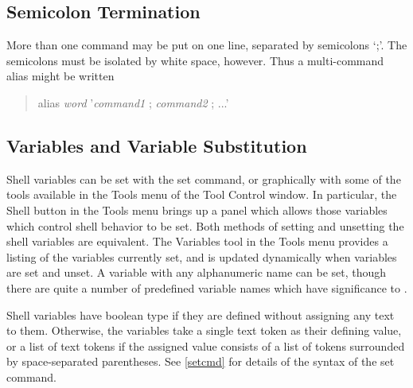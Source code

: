 \subsection{Semicolon Termination}


More than one command may be put on one line, separated by semicolons
`{\vt ;}'.  The semicolons must be isolated by white space, however. 
Thus a multi-command alias might be written
\begin{quote}
{\vt alias} {\it word} '{\it command1} ; {\it command2} ; ...'
\end{quote}

\subsection{Variables and Variable Substitution}
\label{variablesub}


Shell variables can be set with the {\cb set} command, or graphically
with some of the tools available in the {\cb Tools} menu of the {\cb
Tool Control} window.  In particular, the {\cb Shell} button in the
{\cb Tools} menu brings up a panel which allows those variables which
control shell behavior to be set.  Both methods of setting and
unsetting the shell variables are equivalent.  The {\cb Variables}
tool in the {\cb Tools} menu provides a listing of the variables
currently set, and is updated dynamically when variables are set and
unset.  A variable with any alphanumeric name can be set, though there
are quite a number of predefined variable names which have
significance to {\WRspice}.

Shell variables have boolean type if they are defined without
assigning any text to them.  Otherwise, the variables take a single
text token as their defining value, or a list of text tokens if the
assigned value consists of a list of tokens surrounded by
space-separated parentheses.  See \ref{setcmd} for details of the
syntax of the {\cb set} command.

